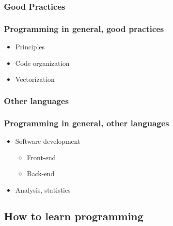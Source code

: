 \subsubsection{Good Practices}

\begin{frame}\frametitle{Programming in general, good practices}

   \begin{itemize}
      \item Principles
      \item Code organization
      \item Vectorization
   \end{itemize}

\end{frame}


\subsubsection{Other languages}

\begin{frame}\frametitle{Programming in general, other languages}

   \begin{itemize}
      \item Software development
      \begin{itemize}
         \item Front-end
         \item Back-end
      \end{itemize}
      \item Analysis, statistics
   \end{itemize}

\end{frame}

\subsection{How to learn programming}

